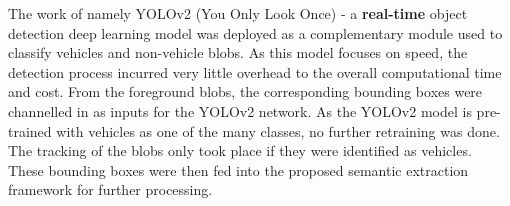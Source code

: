 The work of  namely YOLOv2 (You Only Look Once) - a \textbf{real-time} object detection deep learning model was deployed as a complementary module used to classify vehicles and non-vehicle blobs.
As this model focuses on speed, the detection process incurred very little overhead to the overall computational time and cost.
From the foreground blobs, the corresponding bounding boxes were channelled in as inputs for the YOLOv2 network.
As the YOLOv2 model is pre-trained with vehicles as one of the many classes, no further retraining was done. The tracking of the blobs only took place if they were identified as vehicles. These bounding boxes were then fed into the proposed semantic extraction framework for further processing.


